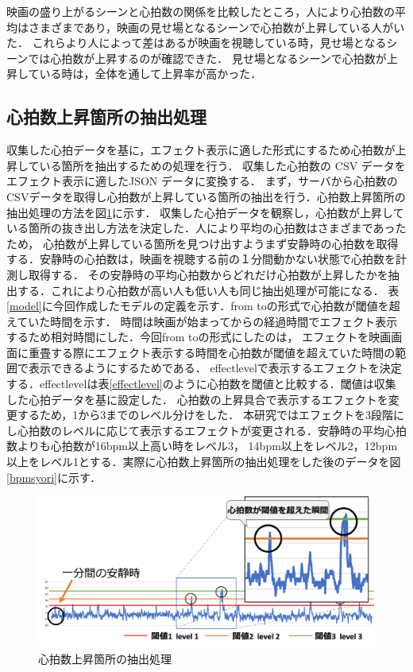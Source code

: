 映画の盛り上がるシーンと心拍数の関係を比較したところ，人により心拍数の平均はさまざまであり，映画の見せ場となるシーンで心拍数が上昇している人がいた．
これらより人によって差はあるが映画を視聴している時，見せ場となるシーンでは心拍数が上昇するのが確認できた．
見せ場となるシーンで心拍数が上昇している時は，全体を通して上昇率が高かった．



\subsection{心拍数上昇箇所の抽出処理}
収集した心拍データを基に，エフェクト表示に適した形式にするため心拍数が上昇している箇所を抽出するための処理を行う．
収集した心拍数の CSV データをエフェクト表示に適したJSON データに変換する．
まず，サーバから心拍数のCSVデータを取得し心拍数が上昇している箇所の抽出を行う．心拍数上昇箇所の抽出処理の方法を図\ref{bpmupp}に示す．
収集した心拍データを観察し，心拍数が上昇している箇所の抜き出し方法を決定した．人により平均の心拍数はさまざまであったため，
心拍数が上昇している箇所を見つけ出すようまず安静時の心拍数を取得する．安静時の心拍数は，映画を視聴する前の１分間動かない状態で心拍数を計測し取得する．
その安静時の平均心拍数からどれだけ心拍数が上昇したかを抽出する．これにより心拍数が高い人も低い人も同じ抽出処理が可能になる．
表\ref{model}に今回作成したモデルの定義を示す．from toの形式で心拍数が閾値を超えていた時間を示す．
時間は映画が始まってからの経過時間でエフェクト表示するため相対時間にした．今回from toの形式にしたのは，
エフェクトを映画画面に重畳する際にエフェクト表示する時間を心拍数が閾値を超えていた時間の範囲で表示できるようにするためである．
effectlevelで表示するエフェクトを決定する．effectlevelは表\ref{effectlevel}のように心拍数を閾値と比較する．閾値は収集した心拍データを基に設定した．
心拍数の上昇具合で表示するエフェクトを変更するため，1から3までのレベル分けをした．
本研究ではエフェクトを3段階にし心拍数のレベルに応じて表示するエフェクトが変更される．安静時の平均心拍数よりも心拍数が16bpm以上高い時をレベル3，
14bpm以上をレベル2，12bpm 以上をレベル1とする．実際に心拍数上昇箇所の抽出処理をした後のデータを図\ref{bpmsyori}に示す．


\begin{figure}[H]
    \centering
    \includegraphics[width=16cm]{images/chapter3/haisyutusyori.png}
    \caption{心拍数上昇箇所の抽出処理}
    \label{bpmupp}
\end{figure}


